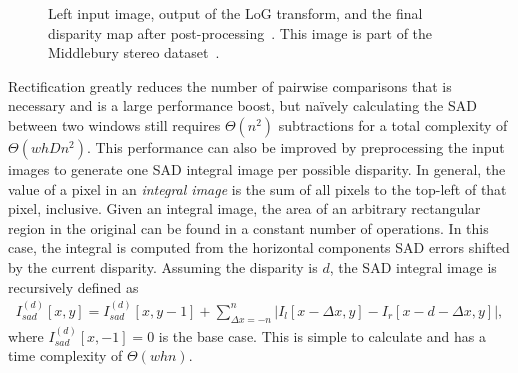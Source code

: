 \documentclass{article}
\newcommand{\abs}[1]{\left|#1\right|}
\begin{document}
\begin{figure}
    \centering
    \caption{
        Left input image, output of the LoG transform, and the final disparity
        map after post-processing~\cite{konolige97}. This image is part of the
        Middlebury stereo dataset~\cite{scharstein2003}.
    }
    \label{fig:images}
\end{figure}

Rectification greatly reduces the number of pairwise comparisons that is
necessary and is a large performance boost, but na\"{i}vely calculating the SAD
between two windows still requires $\Theta(n^2)$ subtractions for a total
complexity of $\Theta(whDn^2)$. This performance can also be improved by
preprocessing the input images to generate one SAD integral image per possible
disparity. In general, the value of a pixel in an \textit{integral image} is
the sum of all pixels to the top-left of that pixel, inclusive. Given an
integral image, the area of an arbitrary rectangular region in the original can
be found in a constant number of operations. In this case, the integral is
computed from the horizontal components SAD errors shifted by the current
disparity. Assuming the disparity is $d$, the SAD integral image is recursively
defined as
\begin{align*}
    I_{sad}^{(d)}[x, y] =
        I_{sad}^{(d)}[x, y - 1]
        + \sum_{\Delta x = -n}^n
          \abs{I_l[x - \Delta x, y] - I_r[x - d - \Delta x, y]},
\end{align*}
where $I_{sad}^{(d)}[x, -1] = 0$ is the base case. This is simple to calculate
and has a time complexity of $\Theta(w h n)$.
\end{document}
